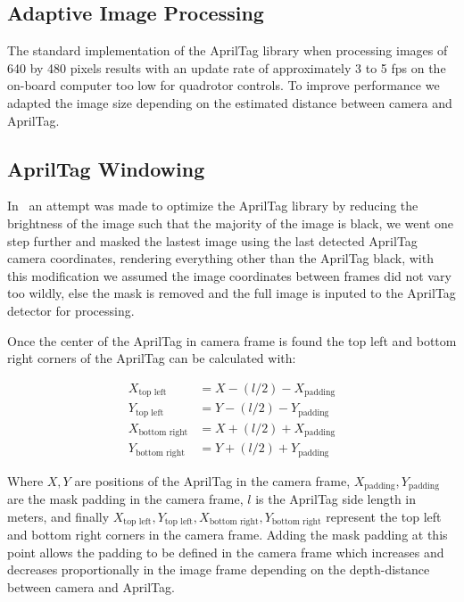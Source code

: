 \documentclass[letterpaper, 10 pt, conference]{ieeeconf}
\begin{document}
\subsection{Adaptive Image Processing}
The standard implementation of the AprilTag library when processing images
of 640 by 480 pixels results with an update rate of approximately 3 to
5 fps on the on-board computer too low for quadrotor controls. To improve
performance we adapted the image size depending on the estimated
distance between camera and AprilTag.

\subsection{AprilTag Windowing}
In~\cite{Ling2014} an attempt was made to optimize the AprilTag library
by reducing the brightness of the image such that the majority of the
image is black, we went one step further and masked the lastest image
using the last detected AprilTag camera coordinates, rendering everything
other than the AprilTag black, with this modification we assumed the image
coordinates between frames did not vary too wildly, else the mask is
removed and the full image is inputed to the AprilTag detector for
processing.

Once the center of the AprilTag in camera frame is found the top left and
bottom right corners of the AprilTag can be calculated with:

\begin{align}
  X_{\text{top left}} &= X - (l / 2) - X_{\text{padding}} \\
  Y_{\text{top left}} &= Y - (l / 2) - Y_{\text{padding}} \\
  X_{\text{bottom right}} &= X + (l / 2) + X_{\text{padding}} \\
  Y_{\text{bottom right}} &= Y + (l / 2) + Y_{\text{padding}}
\end{align}

Where $X, Y$ are positions of the AprilTag in the camera frame,
$X_{\text{padding}}, Y_{\text{padding}}$ are the mask padding in the camera
frame, $l$ is the AprilTag side length in meters, and finally $X_{\text{top
left}}, Y_{\text{top left}}, X_{\text{bottom right}}, Y_{\text{bottom right}}$
represent the top left and bottom right corners in the camera frame. Adding the
mask padding at this point allows the padding to be defined in the camera
frame which increases and decreases proportionally in the image frame
depending on the depth-distance between camera and AprilTag.
\end{document}
